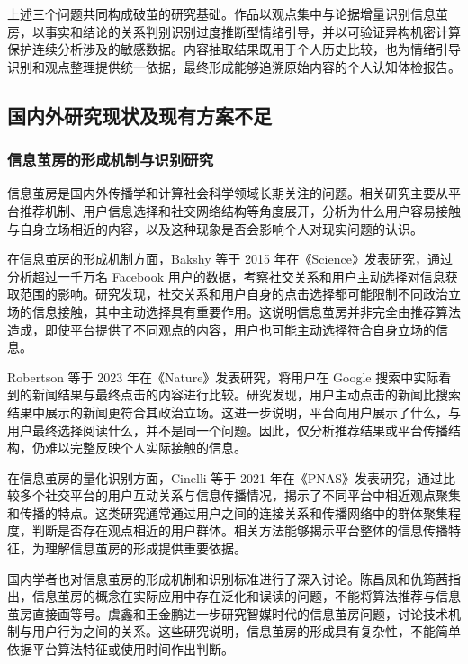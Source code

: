 上述三个问题共同构成破茧的研究基础。作品以观点集中与论据增量识别信息茧房，以事实和结论的关系判别识别过度推断型情绪引导，并以可验证异构机密计算保护连续分析涉及的敏感数据。内容抽取结果既用于个人历史比较，也为情绪引导识别和观点整理提供统一依据，最终形成能够追溯原始内容的个人认知体检报告。

\subsection{国内外研究现状及现有方案不足}\label{section:1.3}

\subsubsection{信息茧房的形成机制与识别研究}\label{section:1.3.1}

信息茧房是国内外传播学和计算社会科学领域长期关注的问题。相关研究主要从平台推荐机制、用户信息选择和社交网络结构等角度展开，分析为什么用户容易接触与自身立场相近的内容，以及这种现象是否会影响个人对现实问题的认识。

在信息茧房的形成机制方面，Bakshy 等于 2015 年在《Science》发表研究，通过分析超过一千万名 Facebook 用户的数据，考察社交关系和用户主动选择对信息获取范围的影响\cite{ref3}。研究发现，社交关系和用户自身的点击选择都可能限制不同政治立场的信息接触，其中主动选择具有重要作用。这说明信息茧房并非完全由推荐算法造成，即使平台提供了不同观点的内容，用户也可能主动选择符合自身立场的信息。

Robertson 等于 2023 年在《Nature》发表研究，将用户在 Google 搜索中实际看到的新闻结果与最终点击的内容进行比较\cite{ref4}。研究发现，用户主动点击的新闻比搜索结果中展示的新闻更符合其政治立场。这进一步说明，平台向用户展示了什么，与用户最终选择阅读什么，并不是同一个问题。因此，仅分析推荐结果或平台传播结构，仍难以完整反映个人实际接触的信息。

在信息茧房的量化识别方面，Cinelli 等于 2021 年在《PNAS》发表研究，通过比较多个社交平台的用户互动关系与信息传播情况，揭示了不同平台中相近观点聚集和传播的特点\cite{ref1}。这类研究通常通过用户之间的连接关系和传播网络中的群体聚集程度，判断是否存在观点相近的用户群体。相关方法能够揭示平台整体的信息传播特征，为理解信息茧房的形成提供重要依据。

国内学者也对信息茧房的形成机制和识别标准进行了深入讨论。陈昌凤和仇筠茜指出，信息茧房的概念在实际应用中存在泛化和误读的问题，不能将算法推荐与信息茧房直接画等号\cite{ref34}。虞鑫和王金鹏进一步研究智媒时代的信息茧房问题，讨论技术机制与用户行为之间的关系\cite{ref6}。这些研究说明，信息茧房的形成具有复杂性，不能简单依据平台算法特征或使用时间作出判断。

